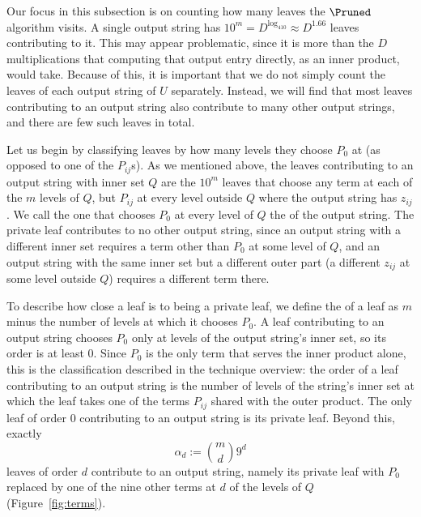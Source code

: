 Our focus in this subsection is on counting how many leaves the $\Pruned$ algorithm visits. A single output string has $10^m=D^{\log_410}\approx D^{1.66}$ leaves contributing to it. This may appear problematic, since it is more than the $D$ multiplications that computing that output entry directly, as an inner product, would take. Because of this, it is important that we do not simply count the leaves of each output string of $U$ separately. Instead, we will find that most leaves contributing to an output string also contribute to many other output strings, and there are few such leaves in total.

Let us begin by classifying leaves by how many levels they choose $P_0$ at (as opposed to one of the $P_{ij}$s). As we mentioned above, the leaves contributing to an output string with inner set $Q$ are the $10^m$ leaves that choose any term at each of the $m$ levels of $Q$, but $P_{ij}$ at every level outside $Q$ where the output string has $z_{ij}$. We call the one that chooses $P_0$ at every level of $Q$ the  of the output string. The private leaf contributes to no other output string, since an output string with a different inner set requires a term other than $P_0$ at some level of $Q$, and an output string with the same inner set but a different outer part (a different $z_{ij}$ at some level outside $Q$) requires a different term there. 

To describe how close a leaf is to being a private leaf, we define the  of a leaf as $m$ minus the number of levels at which it chooses $P_0$. A leaf contributing to an output string chooses $P_0$ only at levels of the output string's inner set, so its order is at least $0$. Since $P_0$ is the only term that serves the inner product alone, this is the classification described in the technique overview: the order of a leaf contributing to an output string is the number of levels of the string's inner set at which the leaf takes one of the terms $P_{ij}$ shared with the outer product. The only leaf of order $0$ contributing to an output string is its private leaf. Beyond this, exactly
\[
\alpha_d:=\binom md9^d
\]
leaves of order $d$ contribute to an output string, namely its private leaf with $P_0$ replaced by one of the nine other terms at $d$ of the levels of $Q$ (Figure~\ref{fig:terms}).

